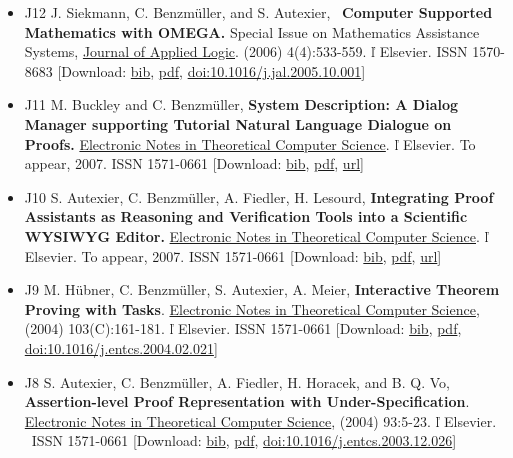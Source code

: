 \documentclass{article}
\newcommand{\tmstrong}[1]{\textbf{#1}}
\newcommand{\tmtextbf}[1]{{\bfseries{#1}}}
\newenvironment{itemizedot}{\begin{itemize} \renewcommand{\labelitemi}{$\bullet$}\renewcommand{\labelitemii}{$\bullet$}\renewcommand{\labelitemiii}{$\bullet$}\renewcommand{\labelitemiv}{$\bullet$}}{\end{itemize}}
\begin{document}
{{\begin{itemizedot}
  \item [J12] J. Siekmann, C. Benzm\"uller, and S. Autexier, \
  \tmtextbf{Computer Supported Mathematics with OMEGA.} Special Issue on
  Mathematics Assistance Systems,
  \href{http://www.elsevier.com/wps/find/journaldescription.cws\_home/672712/description\#description}{Journal
  of Applied Logic}. (2006) 4(4):533-559.  \v{l}  Elsevier. ISSN 1570-8683
  {\color{grey} [Download: \href{../papers/J12.bib}{bib},
  \href{../papers/J12.pdf}{pdf},
  \href{http://dx.doi.org/10.1016/j.jal.2005.10.008}{doi:10.1016/j.jal.2005.10.001}]}
  
  \item [J11] M. Buckley and C. Benzm\"uller, \tmtextbf{System Description: A
  Dialog Manager supporting Tutorial Natural Language Dialogue on Proofs.}
  \tmtextbf{
  }\href{http://www.elsevier.com/wps/find/journaldescription.cws\_home/681021/description\#description}{Electronic
  Notes in Theoretical Computer Science}.  \v{l}  Elsevier. To appear, 2007.
  ISSN 1571-0661 {\color{grey} [Download: {\small
  \href{../papers/J11.bib}{bib}}, {\small \href{../papers/J11.pdf}{pdf}},
  {\small \href{}{url}}]}
  
  \item [J10] S. Autexier, C. Benzm\"uller, A. Fiedler, H. Lesourd,
  \tmtextbf{Integrating Proof Assistants as Reasoning and Verification Tools
  into a Scientific WYSIWYG Editor.} \tmtextbf{
  }\href{http://www.elsevier.com/wps/find/journaldescription.cws\_home/681021/description\#description}{Electronic
  Notes in Theoretical Computer Science}.  \v{l}  Elsevier. To
  appear{\tmstrong{}}, 2007. ISSN 1571-0661 {\color{grey} [Download: {\small
  \href{../papers/J10.bib}{bib}}, {\small \href{../papers/J10.pdf}{pdf}},
  {\small \href{}{url}}]}
  
  \item [J9] M. H\"ubner, C. Benzm\"uller, S. Autexier, A. Meier,
  \tmtextbf{Interactive Theorem Proving with Tasks}. \tmtextbf{
  }\href{http://www.elsevier.com/wps/find/journaldescription.cws\_home/681021/description\#description}{Electronic
  Notes in Theoretical Computer Science}, (2004) 103(C):161-181.  \v{l} 
  Elsevier. ISSN 1571-0661 {\color{grey} [Download: {\small
  \href{../papers/J9.bib}{bib}, \href{../papers/J9.pdf}{pdf}}, {\small
  \href{http://dx.doi.org/10.1016/j.entcs.2004.02.021}{doi:10.1016/j.entcs.2004.02.021}}]}
  
  \item [J8] S. Autexier, C. Benzm\"uller, A. Fiedler, H. Horacek, and B. Q.
  Vo, \tmtextbf{Assertion-level Proof Representation with
  Under-Specification}. \tmtextbf{
  }\href{http://www.elsevier.com/wps/find/journaldescription.cws\_home/681021/description\#description}{Electronic
  Notes in Theoretical Computer Science}, (2004) 93:5-23.  \v{l}  Elsevier. \
  ISSN 1571-0661 {\color{grey} [Download: {\small
  \href{../papers/J8.bib}{bib}, \href{../papers/J8.pdf}{pdf}}, {\small
  \href{http://dx.doi.org/10.1016/j.entcs.2003.12.026}{doi:10.1016/j.entcs.2003.12.026}}]}
  

\end{itemizedot}}}
\end{document}
